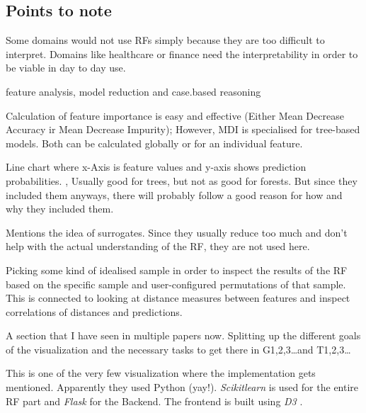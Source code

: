 \documentclass[a4paper, 12pt]{article}
\begin{document}
\subsection{Points to note}
\begin{description}[font=$\bullet$~\normalfont]
        \item[Poor interpretability:]Some domains would not use RFs simply because they are too difficult to
        interpret. Domains like healthcare or finance need the interpretability in order to be viable in day to day
        use.
        \item[3 different RF interpretation methods:] feature analysis, model reduction and case.based reasoning
        \item[Feature Analysis:]Calculation of feature importance is easy and effective (Either Mean Decrease 
        Accuracy ir Mean Decrease Impurity); However, MDI is specialised for tree-based models. Both can be calculated
        globally or for an individual feature.
        \item[Partial Dependence Plots(PDP):]Line chart where x-Axis is feature values and y-axis shows prediction
        probabilities. \cite{friedman2001greedy}, \cite{hastie2009elements}
        Usually good for trees, but not as good for forests. But since they included them anyways, there will
        probably follow a good reason for how and why they included them.
        \item[Model Reduction:] Mentions the idea of surrogates. Since they usually reduce too much and don't help
         with the actual understanding of the RF, they are not used here.
        \item[Case-based Reasoning:]Picking some kind of idealised sample in order to inspect the results of the RF
        based on the specific sample and user-configured permutations of that sample. This is connected to looking
        at distance measures between features and inspect correlations of distances and predictions.
        \item[Design Goals:]A section that I have seen in multiple papers now. Splitting up the different goals of
        the visualization and the necessary tasks to get there in G1,2,3\dots and T1,2,3\dots
        \item[Implementation:] This is one of the very few visualization where the implementation gets
        mentioned. Apparently they used Python (yay!). \textit{Scikitlearn} is used for the entire RF part and
        \textit{Flask} \cite{grinberg2018flask} for the Backend. The frontend is built using \textit{D3} \cite{d3js}.
\end{description}
\end{document}
